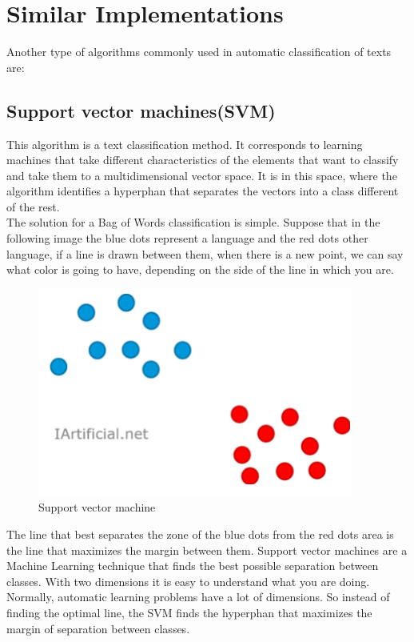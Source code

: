 \documentclass[sigconf,12pt,review=false,natbib=false]{acmart}
\begin{document}
\section{Similar Implementations}

Another type of algorithms commonly used in automatic classification of texts are: \\

\subsection{Support vector machines(SVM)}

This algorithm is a text classification method. It corresponds to learning machines that take different characteristics
of the elements that want to classify and take them to a multidimensional vector space. It is in this space, where the
algorithm identifies a hyperphan that separates the vectors into a class different of the rest. \\

The solution for a Bag of Words classification is simple. Suppose that in the following image the blue dots represent
a language and the red dots other language, if a line is drawn between them, when there is a new point, we can say what
color is going to have, depending on the side of the line in which you are. \\

\begin{figure}[h!]
    \centering
    \includegraphics[]{svm}
    \caption{Support vector machine}
    \label{fig:svm}
\end{figure}

The line that best separates the zone of the blue dots from the red dots area is the line that maximizes the margin
between them. Support vector machines are a Machine Learning technique that finds the best possible separation between
classes. With two dimensions it is easy to understand what you are doing. Normally, automatic learning problems have a
lot of dimensions. So instead of finding the optimal line, the SVM finds the hyperphan that maximizes the margin of
separation between classes. \\
\end{document}
